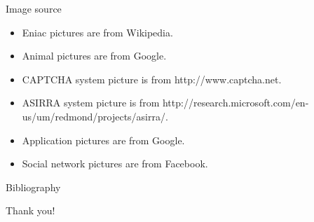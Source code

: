 \documentclass[first=purple,second=dgreen,logo=redexc]{aaltoslides}
\begin{document}
{\begin{frame}{Image source}
	\begin{itemize}
		\item Eniac pictures are from Wikipedia.
		\item Animal pictures are from Google.
		\item CAPTCHA system picture is from http://www.captcha.net.
		\item ASIRRA system picture is from http://research.microsoft.com/en-us/um/redmond/projects/asirra/.
		\item Application pictures are from Google.
		\item Social network pictures are from Facebook.
	\end{itemize}
\end{frame}

\begin{frame}[allowframebreaks]{Bibliography}
%

 
\end{frame}



\begin{frame}{}
	\begin{center}
		\large
		Thank you!
	\end{center}
\end{frame}

}
\end{document}
